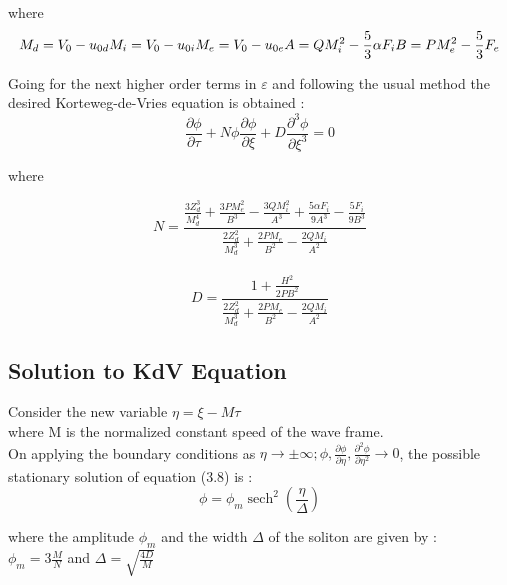 \documentclass[journal]{IEEEtran}
\DeclareMathOperator{\sech}{sech}
\begin{document}
		where
		\begin{equation}
			M_d = V_0 - u_{0d}\\
			M_i = V_0 - u_{0i}\\
			M_e = V_0 - u_{0e}\\
			A = QM_i^2 -\frac{5}{3}\alpha F_i\\
			B = PM_e^2 - \frac{5}{3}F_e
		\end{equation}
		
		Going for the next higher order terms in $\varepsilon$ and following the usual method the desired Korteweg-de-Vries equation is obtained :
		\begin{equation}
			\frac{\partial \phi}{\partial \tau} + N\phi\frac{\partial \phi}{\partial \xi} + D\frac{\partial^3 \phi}{\partial \xi^3} = 0
		\end{equation}
		
		where
	
		\begin{equation*}
					N = \frac{\frac{3Z_d^3}{M_d^4} + \frac{3PM_e^2}{B^3} - \frac{3QM_i^2}{A^3}+ \frac{5\alpha F_i}{9A^3} - \frac{5F_i}{9B^3}}{\frac{2Z_d^2}{M_d^3} + \frac{2PM_e}{B^2} - \frac{2QM_i}{A^2}}
		\end{equation*}\\		
		\begin{equation*}
					D = \frac{1 + \frac{H^2}{2PB^2}}{\frac{2Z_d^2}{M_d^3} + \frac{2PM_e}{B^2} - \frac{2QM_i}{A^2}} 
		\end{equation*}

\subsection{Solution to KdV Equation}
Consider the new variable 
\hbox{$\eta = \xi - M\tau$}\\
		where M is the normalized constant speed of the wave frame.\\
		On applying the boundary conditions as $\eta \rightarrow \pm \infty; \phi, \frac{\partial \phi}{\partial \eta}, \frac{\partial^2 \phi}{\partial \eta^2} \rightarrow 0$, the possible stationary solution of equation (3.8) is :
		\begin{equation}
			\phi = \phi_m \sech^2 (\frac {\eta}{\Delta})
		\end{equation}
	
		where the amplitude $\phi_m$ and the width $\Delta$ of the soliton are given by : \\
	
		$\phi_m = 3\frac{M}{N}$ and $\Delta = \sqrt{\frac{4D}{M}}$ \\ 
\end{document}
